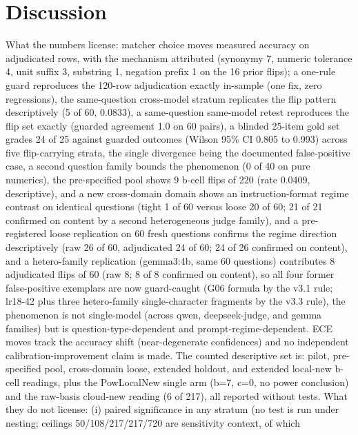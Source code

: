 \documentclass[10pt]{article} %
\begin{document}
\section{Discussion}
\label{sec:discussion}

What the numbers license: matcher choice moves measured accuracy on adjudicated rows, with the mechanism attributed (synonymy 7, numeric tolerance 4, unit suffix 3, substring 1, negation prefix 1 on the 16 prior flips); a one-rule guard reproduces the 120-row adjudication exactly in-sample (one fix, zero regressions), the same-question cross-model stratum replicates the flip pattern descriptively (5 of 60, 0.0833), a same-question same-model retest reproduces the flip set exactly (guarded agreement 1.0 on 60 pairs), a blinded 25-item gold set grades 24 of 25 against guarded outcomes (Wilson 95\% CI 0.805 to 0.993) across five flip-carrying strata, the single divergence being the documented false-positive case, a second question family bounds the phenomenon (0 of 40 on pure numerics), the pre-specified pool shows 9 b-cell flips of 220 (rate 0.0409, descriptive), and a new cross-domain domain shows an instruction-format regime contrast on identical questions (tight 1 of 60 versus loose 20 of 60; 21 of 21 confirmed on content by a second heterogeneous judge family), and a pre-registered loose replication on 60 fresh questions confirms the regime direction descriptively (raw 26 of 60, adjudicated 24 of 60; 24 of 26 confirmed on content), and a hetero-family replication (gemma3:4b, same 60 questions) contributes 8 adjudicated flips of 60 (raw 8; 8 of 8 confirmed on content), so all four former false-positive exemplars are now guard-caught (G06 formula by the v3.1 rule; lr18-42 plus three hetero-family single-character fragments by the v3.3 rule), the phenomenon is not single-model (across qwen, deepseek-judge, and gemma families) but is question-type-dependent and prompt-regime-dependent. ECE moves track the accuracy shift (near-degenerate confidences) and no independent calibration-improvement claim is made. The counted descriptive set is: pilot, pre-specified pool, cross-domain loose, extended holdout, and extended local-new b-cell readings, plus the PowLocalNew single arm (b=7, c=0, no power conclusion) and the raw-basis cloud-new reading (6 of 217), all reported without tests. What they do not license: (i) paired significance in any stratum (no test is run under nesting; ceilings 50/108/217/217/720 are sensitivity context, of which
\end{document}
